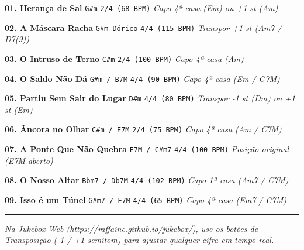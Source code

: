 \documentclass[10pt]{article}
\begin{document}
\noindent\textbf{01. Herança de Sal} \dotfill \texttt{G\#m} \dotfill \texttt{2/4 (68 BPM)} \dotfill \textit{Capo 4ª casa (Em) ou +1 st (Am)}\par\vspace{0.12cm}
\noindent\textbf{02. A Máscara Racha} \dotfill \texttt{G\#m Dórico} \dotfill \texttt{4/4 (115 BPM)} \dotfill \textit{Transpor +1 st (Am7 / D7(9))}\par\vspace{0.12cm}
\noindent\textbf{03. O Intruso de Terno} \dotfill \texttt{C\#m} \dotfill \texttt{2/4 (100 BPM)} \dotfill \textit{Capo 4ª casa (Am)}\par\vspace{0.12cm}
\noindent\textbf{04. O Saldo Não Dá} \dotfill \texttt{G\#m / B7M} \dotfill \texttt{4/4 (90 BPM)} \dotfill \textit{Capo 4ª casa (Em / G7M)}\par\vspace{0.12cm}
\noindent\textbf{05. Partiu Sem Sair do Lugar} \dotfill \texttt{D\#m} \dotfill \texttt{4/4 (80 BPM)} \dotfill \textit{Transpor -1 st (Dm) ou +1 st (Em)}\par\vspace{0.12cm}
\noindent\textbf{06. Âncora no Olhar} \dotfill \texttt{C\#m / E7M} \dotfill \texttt{2/4 (75 BPM)} \dotfill \textit{Capo 4ª casa (Am / C7M)}\par\vspace{0.12cm}
\noindent\textbf{07. A Ponte Que Não Quebra} \dotfill \texttt{E7M / C\#m7} \dotfill \texttt{4/4 (100 BPM)} \dotfill \textit{Posição original (E7M aberto)}\par\vspace{0.12cm}
\noindent\textbf{08. O Nosso Altar} \dotfill \texttt{Bbm7 / Db7M} \dotfill \texttt{4/4 (102 BPM)} \dotfill \textit{Capo 1ª casa (Am7 / C7M)}\par\vspace{0.12cm}
\noindent\textbf{09. Isso é um Túnel} \dotfill \texttt{G\#m7 / E7M} \dotfill \texttt{4/4 (65 BPM)} \dotfill \textit{Capo 4ª casa (Em7 / C7M)}\par

\vfill
\begin{center}
  {\color{vinylochre}\rule{\textwidth}{0.6pt}}\par\vspace{0.1cm}
  {\itshape\footnotesize\color{vinylmuted} Na Jukebox Web (https://raffaine.github.io/jukebox/), use os botões de Transposição (-1 / +1 semitom) para ajustar qualquer cifra em tempo real.}
\end{center}
\newpage
\end{document}
